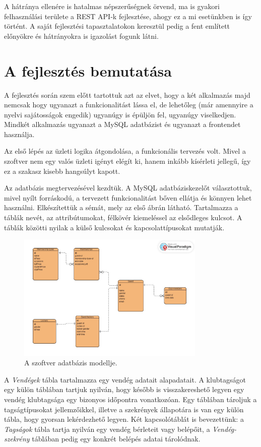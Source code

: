 \documentclass[12pt]{article}
\begin{document}
A hátránya ellenére is hatalmas népszerűségnek örvend, ma is gyakori felhasználási területe a REST API-k fejlesztése, ahogy ez a mi esetünkben is így történt. A saját fejlesztési tapasztalatokon keresztül pedig a fent említett előnyökre és hátrányokra is igazolást fogunk látni.

\newpage
\section{A fejlesztés bemutatása}

A fejlesztés során szem előtt tartottuk azt az elvet,  hogy a két alkalmazás majd nemcsak hogy ugyanazt a funkcionalitást lássa el, de lehetőleg (már amennyire a nyelvi sajátosságok engedik) ugyanúgy is épüljön fel, ugyanúgy viselkedjen.  Mindkét alkalmazás ugyanazt a MySQL adatbázist és ugyanazt a frontendet használja.

Az első lépés az üzleti logika átgondolása, a funkcionális tervezés volt. Mivel a szoftver nem egy valós üzleti igényt elégít ki, hanem inkább kísérleti jellegű, így ez a szakasz kisebb hangsúlyt kapott.

Az adatbázis megtervezésével kezdtük. A MySQL adatbáziskezelőt választottuk, mivel nyílt forráskodú, a tervezett funkcionalitást bőven ellátja és könnyen lehet használni. Elkészítettük a sémát, mely az első ábrán látható. Tartalmazza a táblák nevét,  az attribútumokat,  félkövér kiemeléssel az elsődleges kulcsot. A táblák közötti nyilak a külső kulcsokat és kapcsolattípusokat mutatják.
\begin{figure}[h!]
\centering
\includegraphics[width=0.8\textwidth]{database}
\caption{A szoftver adatbázis modellje.}
\end{figure}

A \textit{Vendégek} tábla tartalmazza egy vendég adatait alapadatait. A klubtagságot egy külön táblában tartjuk nyilván, hogy később is visszakereshető legyen egy vendég klubtagsága egy bizonyos időpontra vonatkozóan. Egy táblában tároljuk a tagságtípusokat jellemzőikkel, illetve a szekrények állapotára is van egy külön tábla, hogy gyorsan lekérdezhető legyen. Két kapcsolótáblát is bevezettünk: a \textit{Tagságok} tábla tartja nyilván egy vendég bérleteit vagy belépőit, a \textit{Vendég-szekrény} táblában pedig egy konkrét belépés adatai tárolódnak.
\end{document}
